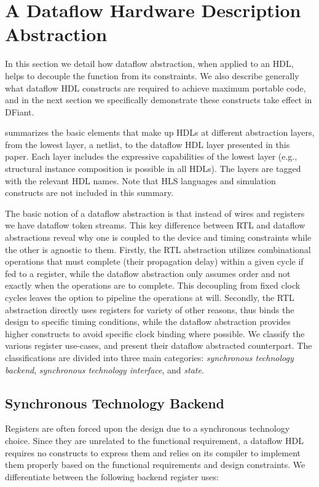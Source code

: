 \section{A Dataflow Hardware Description Abstraction}
\label{sec:motivation}
In this section we detail how dataflow abstraction, when applied to an HDL, helps to decouple the function from its constraints. We also describe generally what dataflow HDL constructs are required to achieve maximum portable code, and in the next section we specifically demonstrate these constructs take effect in DFiant.

 summarizes the basic elements that make up HDLs at different abstraction layers, from the lowest layer, a netlist, to the dataflow HDL layer presented in this paper. Each layer includes the expressive capabilities of the lowest layer (e.g., structural instance composition is possible in all HDLs). The layers are tagged with the relevant HDL names. Note that HLS languages and simulation constructs are not included in this summary. 

The basic notion of a dataflow abstraction is that instead of wires and registers we have dataflow token streams. This key difference between RTL and dataflow abstractions reveal why one is coupled to the device and timing constraints while the other is agnostic to them. Firstly, the RTL abstraction utilizes combinational operations that must complete (their propagation delay) within a given cycle if fed to a register, while the dataflow abstraction only assumes order and not exactly when the operations are to complete. This decoupling from fixed clock cycles leaves the option to pipeline the operations at will. Secondly, the RTL abstraction directly uses registers for variety of other reasons, thus binds the design to specific timing conditions, while the dataflow abstraction provides higher constructs to avoid specific clock binding where possible. We classify the various register use-cases, and present their dataflow abstracted counterpart. The classifications are divided into three main categories: \textit{synchronous technology backend}, \textit{synchronous technology interface}, and \textit{state}.

\subsection{Synchronous Technology Backend}
Registers are often forced upon the design due to a synchronous technology choice. Since they are unrelated to the functional requirement, a dataflow HDL requires no constructs to express them and relies on its compiler to implement them properly based on the functional requirements and design constraints. 
We differentiate between the following backend register uses:

